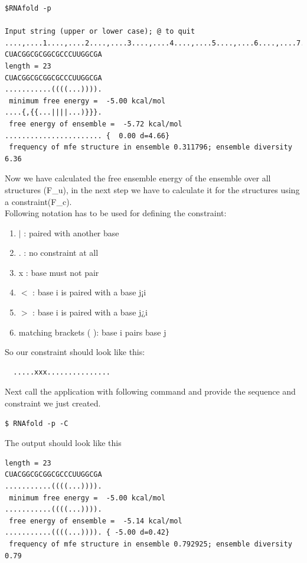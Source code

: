 \documentclass[]{article}
\providecommand{\tightlist}{%
  \setlength{\itemsep}{0pt}\setlength{\parskip}{0pt}}
\begin{document}
\begin{verbatim}
$RNAfold -p

Input string (upper or lower case); @ to quit
....,....1....,....2....,....3....,....4....,....5....,....6....,....7....,....8
CUACGGCGCGGCGCCCUUGGCGA
length = 23
CUACGGCGCGGCGCCCUUGGCGA
...........((((...)))).
 minimum free energy =  -5.00 kcal/mol
....{,{{...||||...)}}}.
 free energy of ensemble =  -5.72 kcal/mol
....................... {  0.00 d=4.66}
 frequency of mfe structure in ensemble 0.311796; ensemble diversity 6.36
\end{verbatim}

Now we have calculated the free ensemble energy of the ensemble over all
structures (F\_u), in the next step we have to calculate it for the
structures using a constraint(F\_c).\\
 Following notation has to be used for defining the constraint:

\begin{enumerate}
\def\labelenumi{\arabic{enumi}.}
\tightlist
\item
  \(|\) : paired with another base
\item
  . : no constraint at all
\item
  x : base must not pair
\item
  \(<\) : base i is paired with a base j¡i
\item
  \(>\) : base i is paired with a base j¿i
\item
  matching brackets ( ): base i pairs base j\\
\end{enumerate}

So our constraint should look like this:

\begin{verbatim}
  .....xxx...............
\end{verbatim}

Next call the application with following command and provide the
sequence and constraint we just created.

\begin{verbatim}
$ RNAfold -p -C
\end{verbatim}

The output should look like this

\begin{verbatim}
length = 23
CUACGGCGCGGCGCCCUUGGCGA
...........((((...)))).
 minimum free energy =  -5.00 kcal/mol
...........((((...)))).
 free energy of ensemble =  -5.14 kcal/mol
...........((((...)))). { -5.00 d=0.42}
 frequency of mfe structure in ensemble 0.792925; ensemble diversity 0.79
\end{verbatim}
\end{document}
